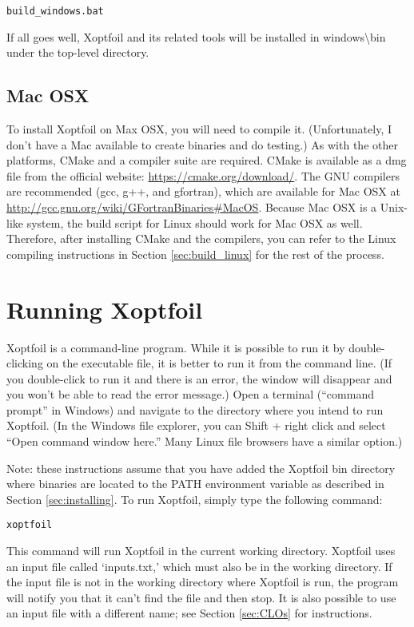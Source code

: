 \documentclass[11pt]{article}
\begin{document}
\begin{verbatim}
build_windows.bat
\end{verbatim}

If all goes well, Xoptfoil and its related tools will be installed in
windows{\textbackslash}bin under
the top-level directory.

\subsection{Mac OSX}

To install Xoptfoil on Max OSX, you will need to compile it. (Unfortunately, I don't have a
Mac available to create binaries and do testing.) As with the other platforms, CMake and
a compiler suite are required. CMake is available as a dmg file from the official website:
\url{https://cmake.org/download/}. The GNU compilers are recommended (gcc, g++, and
gfortran), which are available for Mac OSX at
\url{http://gcc.gnu.org/wiki/GFortranBinaries#MacOS}. Because Mac OSX is a Unix-like
system, the build script for Linux should work for Mac OSX as well. Therefore, after
installing CMake and the compilers, you can refer to the Linux compiling instructions in
Section \ref{sec:build_linux} for the rest of the process.

\section{Running Xoptfoil}\label{sec:running}

Xoptfoil is a command-line program. While it is possible to run it by double-clicking on
the executable file, it is better to run it from the command line. (If you double-click to
run it and there is an error, the window will disappear and you won't be able to read the
error message.) Open a terminal
(``command prompt'' in Windows) and navigate to the directory where you intend to run
Xoptfoil. (In the Windows file explorer, you can Shift + right click and select ``Open
command window here.'' Many Linux file browsers have a similar option.)

Note: these instructions assume that you have added the Xoptfoil bin directory where 
binaries are
located to the PATH environment variable as described in Section \ref{sec:installing}.
To run Xoptfoil, simply type the following command:

\begin{verbatim}
xoptfoil
\end{verbatim}

\noindent This command will run Xoptfoil in the current working
directory.  Xoptfoil uses an input file called `inputs.txt,' which must also be in the
working directory.  If the input file is not in the working directory where Xoptfoil is
run, the program will notify you that it can't find the file and then stop. It is also
possible
to use an input file with a different name; see Section \ref{sec:CLOs} for instructions.
\end{document}
